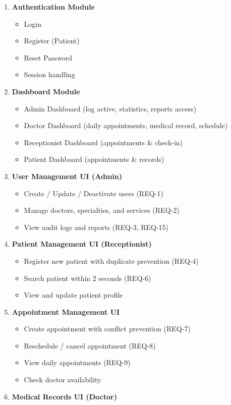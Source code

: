 \begin{enumerate}
	\item \textbf{Authentication Module}
	\begin{itemize}
		\item Login
		\item Register (Patient)
		\item Reset Password
		\item Session handling
	\end{itemize}
	\item \textbf{Dashboard Module}
	\begin{itemize}
		\item Admin Dashboard (log active, statistics, reports access)
		\item Doctor Dashboard (daily appointments, medical record, schedule)
		\item Receptionist Dashboard (appointments \& check-in)
		\item Patient Dashboard (appointments \& records)
	\end{itemize}
	\item \textbf{User Management UI (Admin)}
	\begin{itemize}
		\item Create / Update / Deactivate users (REQ-1)
		\item Manage doctors, specialties, and services (REQ-2)
		\item View audit logs and reports (REQ-3, REQ-15)
	\end{itemize}
	\item \textbf{Patient Management UI (Receptionist)}
	\begin{itemize}
		\item Register new patient with duplicate prevention (REQ-4)
		\item Search patient within 2 seconds (REQ-6)
		\item View and update patient profile
	\end{itemize}
	\item \textbf{Appointment Management UI}
	\begin{itemize}
		\item Create appointment with conflict prevention (REQ-7)
		\item Reschedule / cancel appointment (REQ-8)
		\item View daily appointments (REQ-9)
		\item Check doctor availability
	\end{itemize}
	\item \textbf{Medical Records UI (Doctor)}

\end{enumerate}

